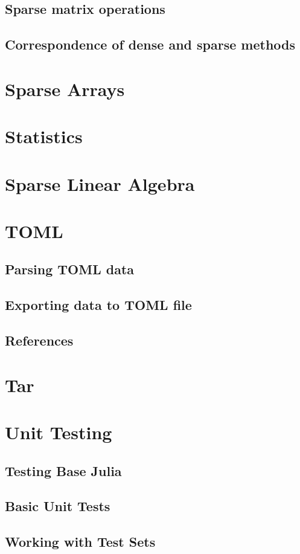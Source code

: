     \section{Sparse matrix operations}
    \section{Correspondence of dense and sparse methods}
\chapter{Sparse Arrays}
\chapter{Statistics}
\chapter{Sparse Linear Algebra}
\chapter{TOML}
    \section{Parsing TOML data}
    \section{Exporting data to TOML file}
    \section{References}
\chapter{Tar}
\chapter{Unit Testing}
    \section{Testing Base Julia}
    \section{Basic Unit Tests}
    \section{Working with Test Sets}
